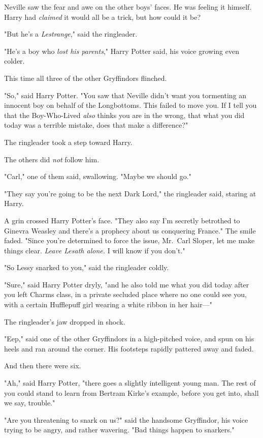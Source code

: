 Neville saw the fear and awe on the other boys' faces. He was feeling it 
himself. Harry had \emph{claimed} it would all be a trick, but how could it be?

"But he's a \emph{Lestrange}," said the ringleader.

"He's a boy who \emph{lost his parents}," Harry Potter said, his voice growing 
even colder.

This time all three of the other Gryffindors flinched.

"So," said Harry Potter. "You saw that Neville didn't want you tormenting an 
innocent boy on behalf of the Longbottoms. This failed to move you. If I tell 
you that the Boy-Who-Lived \emph{also} thinks you are in the wrong, that what 
you did today was a terrible mistake, does that make a difference?"

The ringleader took a step toward Harry.

The others did \emph{not} follow him.

"Carl," one of them said, swallowing. "Maybe we should go."

"They say you're going to be the next Dark Lord," the ringleader said, staring 
at Harry.

A grin crossed Harry Potter's face. "They also say I'm secretly betrothed to 
Ginevra Weasley and there's a prophecy about us conquering France." The smile 
faded. "Since you're determined to force the issue, Mr.~Carl Sloper, let me 
make things clear. \emph{Leave Lesath alone.} I will know if you don't."

"So Lessy snarked to you," said the ringleader coldly.

"Sure," said Harry Potter dryly, "and he also told me what you did today after 
you left Charms class, in a private secluded place where no one could see you, 
with a certain Hufflepuff girl wearing a white ribbon in her hair---"

The ringleader's jaw dropped in shock.

"Eep," said one of the other Gryffindors in a high-pitched voice, and spun on 
his heels and ran around the corner. His footsteps rapidly pattered away and 
faded.

And then there were six.

"Ah," said Harry Potter, "there goes a slightly intelligent young man. The rest 
of you could stand to learn from Bertram Kirke's example, before you get into, 
shall we say, trouble."

"Are you threatening to snark on us?" said the handsome Gryffindor, his voice 
trying to be angry, and rather wavering. "Bad things happen to snarkers."

